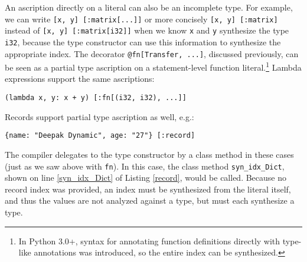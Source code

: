 \documentclass[9pt]{sigplanconf}
\newcommand{\lstinlinep}[1]{\lstinline[language=Python,basicstyle=\ttfamily\small,deletendkeywords={tuple,buffer,map}]{#1}}
\begin{document}
An ascription directly on a literal can also be an incomplete type. For example, we can write \lstinline[basicstyle=\ttfamily\small]{[x, y] [:matrix[...]]} or more concisely \lstinline[basicstyle=\ttfamily\small]{[x, y] [:matrix]} instead of \lstinline[basicstyle=\ttfamily\small]{[x, y] [:matrix[i32]]} when we know \lstinline[basicstyle=\ttfamily\small]{x} and \lstinline[basicstyle=\ttfamily\small]{y} synthesize the type \lstinline[basicstyle=\ttfamily\small]{i32}, because the type constructor can use this information to synthesize the appropriate index. The decorator \lstinline[basicstyle=\ttfamily\small]{@fn[Transfer, ...]}, discussed previously, can be seen as a partial type ascription on a statement-level function literal.\footnote{In Python 3.0+, syntax for annotating function definitions directly with type-like annotations was introduced, so the entire index can be synthesized.} Lambda expressions support the same ascriptions:
\vspace{3px}
\begin{lstlisting}[numbers=none, basicstyle=\ttfamily\scriptsize]
(lambda x, y: x + y) [:fn[(i32, i32), ...]]
\end{lstlisting}
\noindent
Records support partial type ascription as well, e.g.: 
\vspace{3px}
\begin{lstlisting}[numbers=none,basicstyle=\ttfamily\scriptsize]
{name: "Deepak Dynamic", age: "27"} [:record]
\end{lstlisting}
\noindent
The compiler delegates to the type constructor by a class method in these cases (just as we saw above with \lstinlinep{fn}). In this case, the class method \lstinlinep{syn_idx_Dict}, shown on line \ref{syn_idx_Dict} of Listing \ref{record}, would be called. Because no record index was provided, an index must be synthesized from the literal itself, and thus the values are not analyzed against a type, but must each synthesize a type.
\end{document}
